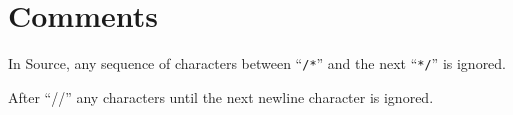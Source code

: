 \section*{Comments}

In Source, any sequence of characters between ``\texttt{/*}'' and
the next ``\texttt{*/}'' is ignored.

After ``//'' any characters until the next newline character is ignored.
